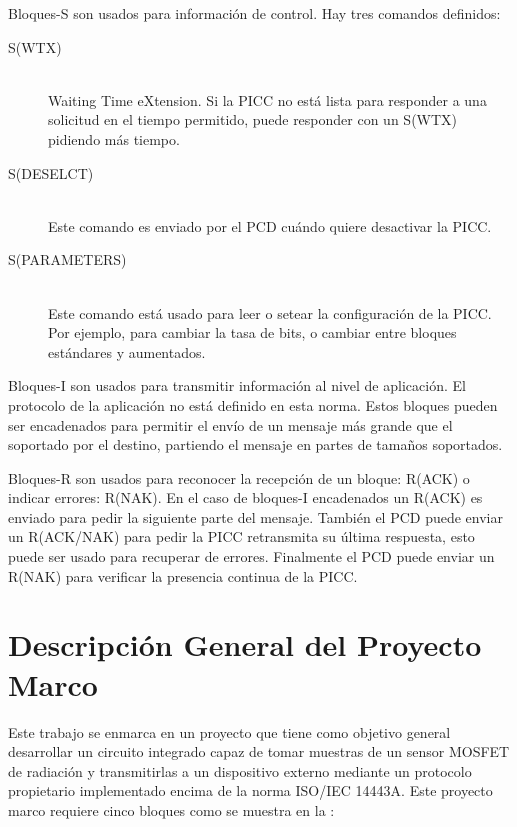 \documentclass[a4paper, twoside, 11pt]{report}
\begin{document}
Bloques-S son usados para información de control. Hay tres comandos definidos:

\begin{description}
  \item[S(WTX)] \hfill \\ Waiting Time eXtension. Si la PICC no está lista para responder a una solicitud en el tiempo permitido, puede responder con un S(WTX) pidiendo más tiempo.
  \item[S(DESELCT)] \hfill \\ Este comando es enviado por el PCD cuándo quiere desactivar la PICC.
  \item[S(PARAMETERS)] \hfill \\ Este comando está usado para leer o setear la configuración de la PICC. Por ejemplo, para cambiar la tasa de bits, o cambiar entre bloques estándares y aumentados.
\end{description}

Bloques-I son usados para transmitir información al nivel de aplicación. El protocolo de la aplicación no está definido en esta norma. Estos bloques pueden ser encadenados para permitir el envío de un mensaje más grande que el soportado por el destino, partiendo el mensaje en partes de tamaños soportados.

Bloques-R son usados para reconocer la recepción de un bloque: R(ACK) o indicar errores: R(NAK). En el caso de bloques-I encadenados un R(ACK) es enviado para pedir la siguiente parte del mensaje. También el PCD puede enviar un R(ACK/NAK) para pedir la PICC retransmita su última respuesta, esto puede ser usado para recuperar de errores. Finalmente el PCD puede enviar un R(NAK) para verificar la presencia continua de la PICC.


\FloatBarrier
\chapter{Descripción General del Proyecto Marco}

Este trabajo se enmarca en un proyecto que tiene como objetivo general desarrollar un circuito integrado capaz de tomar muestras de un sensor MOSFET de radiación y transmitirlas a un dispositivo externo mediante un protocolo propietario implementado encima de la norma ISO/IEC 14443A. Este proyecto marco requiere cinco bloques como se muestra en la :
\end{document}
